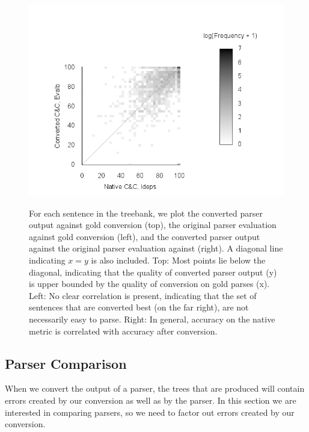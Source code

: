 \begin{figure}
{    \hfill
    \includegraphics[trim={15mm 0 65mm 40mm},clip]{figures/heat-both}
  }
	\caption[Heatmaps comparing gold conversion accuracy, \ccg native evaluation, and converted evaluation.]{ \label{fig:scatter_plots}
		For each sentence in the treebank, we plot the converted parser output against gold conversion (top), the original parser evaluation against gold conversion (left), and the converted parser output against the original parser evaluation against (right).
		A diagonal line indicating $x=y$ is also included.
		Top: Most points lie below the diagonal, indicating that the quality of converted parser output (y) is upper bounded by the quality of conversion on gold parses (x).
		Left: No clear correlation is present, indicating that the set of sentences that are converted best (on the far right), are not necessarily easy to parse.
		Right: In general, accuracy on the native metric is correlated with accuracy after conversion.
	}
\end{figure}

\subsection{Parser Comparison}

When we convert the output of a \ccg parser, the \ptb trees that are produced
will contain errors created by our conversion as well as by the parser. In this
section we are interested in comparing parsers, so we need to factor out errors
created by our conversion.

